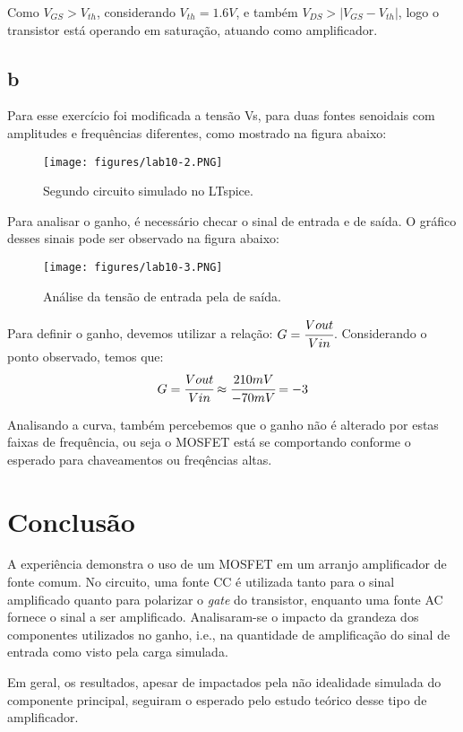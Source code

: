 \documentclass[a4paper]{report}
\begin{document}
Como $V_{GS} > V_{th}$, considerando $V_{th} = 1.6 V$, e também $V_{DS} >  | V_{GS} - V_{th} |$, logo o transistor está operando em saturação, atuando como amplificador.

\subsection*{b}

Para esse exercício foi modificada a tensão Vs, para duas fontes senoidais com amplitudes e frequências diferentes, como mostrado na figura abaixo:

\begin{figure}[H]
    \centering
    \texttt{[image: figures/lab10-2.PNG]}
    \caption{Segundo circuito simulado no LTspice.}
\end{figure}

Para analisar o ganho, é necessário checar o sinal de entrada e de saída. O gráfico desses sinais pode ser observado na figura abaixo:

\begin{figure}[H]
    \centering
    \texttt{[image: figures/lab10-3.PNG]}
    \caption{Análise da tensão de entrada pela de saída.}
\end{figure}

Para definir o ganho, devemos utilizar a relação: $G = \cfrac{Vout}{Vin}$. Considerando o ponto observado, temos que:
$$
G = \cfrac{Vout}{Vin} \approx \cfrac{210mV}{-70mV} = -3  
$$

Analisando a curva, também percebemos que o ganho não é alterado por estas faixas de frequência, ou seja o MOSFET está se comportando conforme o esperado para chaveamentos ou freqências altas.

\section{Conclusão}

A experiência demonstra o uso de um MOSFET em um arranjo amplificador de fonte comum. No circuito, uma fonte CC é utilizada tanto para o sinal amplificado quanto para polarizar o \textit{gate} do transistor, enquanto uma fonte AC fornece o sinal a ser amplificado. Analisaram-se o impacto da grandeza dos componentes utilizados no ganho, i.e., na quantidade de amplificação do sinal de entrada como visto pela carga simulada.

Em geral, os resultados, apesar de impactados pela não idealidade simulada do componente principal, seguiram o esperado pelo estudo teórico desse tipo de amplificador.
\end{document}
